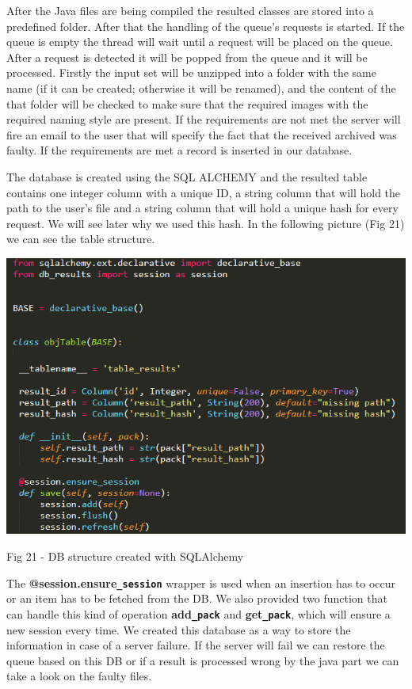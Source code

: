 \documentclass[12pt, a4paper]{report}
\begin{document}
After the Java files are being compiled the resulted classes are stored into a predefined folder. After that the handling of the queue's requests is started. If the queue is empty the thread will wait until a request will be placed on the queue. After a request is detected it will be popped from the queue and it will be processed. Firstly the input set will be unzipped into a folder with the same name (if it can be created; otherwise it will be renamed), and the content of the that folder will be checked to make sure that the required images with the required naming style are present. If the requirements are not met the server will fire an email to the user that will specify the fact that the received archived was faulty. If the requirements are met a record is inserted in our database.
\par 

The database is created using the SQL ALCHEMY and the resulted table contains one integer column with a unique ID, a string column that will hold the path to the user's file and a string column that will hold a unique hash for every request. We will see later why we used this hash. In the following picture (Fig 21) we can see the table structure.
\par

\medskip
\includegraphics[scale=0.9, right]{database_table.png}
\begin{center}
Fig 21 - DB structure created with SQLAlchemy 
\end{center}
\par 

The \textbf{@session.ensure\texttt{\_session}} wrapper is used when an insertion has to occur or an item has to be fetched from the DB. We also provided two function that can handle this kind of operation \textbf{add\texttt{\_pack}} and \textbf{get\texttt{\_pack}}, which will ensure a new session every time. We created this database as a way to store the information in case of a server failure. If the server will fail we can restore the queue based on this DB or if a result is processed wrong by the java part we can take a look on the faulty files.
\par 
\end{document}
